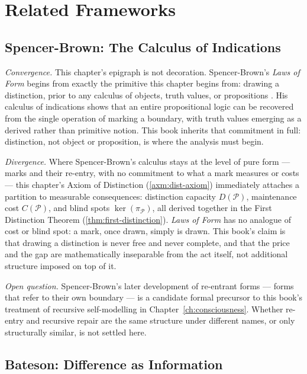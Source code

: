 \documentclass[12pt,twoside,openright]{book}
\newcommand{\partition}{\mathcal{P}}
\begin{document}
\section{Related Frameworks}
\label{sec:ch1-related-frameworks}

\subsection*{Spencer-Brown: The Calculus of Indications}

\emph{Convergence.} This chapter's epigraph is not decoration.
Spencer-Brown's \emph{Laws of Form} begins from exactly the
primitive this chapter begins from: drawing a distinction,
prior to any calculus of objects, truth values, or
propositions \parencite{spencer-brown1969}. His calculus of
indications shows that an entire propositional logic can be
recovered from the single operation of marking a boundary,
with truth values emerging as a derived rather than primitive
notion. This book inherits that commitment in full: distinction,
not object or proposition, is where the analysis must begin.

\emph{Divergence.} Where Spencer-Brown's calculus stays at the
level of pure form --- marks and their re-entry, with no
commitment to what a mark measures or costs --- this chapter's
Axiom of Distinction (\cref{axm:dist-axiom}) immediately
attaches a partition to measurable consequences: distinction
capacity $D(\partition)$, maintenance cost $C(\partition)$, and
blind spots $\ker(\pi_\partition)$, all derived together in the
First Distinction Theorem (\cref{thm:first-distinction}).
\emph{Laws of Form} has no analogue of cost or blind spot: a
mark, once drawn, simply is drawn. This book's claim is that
drawing a distinction is never free and never complete, and
that the price and the gap are mathematically inseparable from
the act itself, not additional structure imposed on top of it.

\emph{Open question.} Spencer-Brown's later development of
re-entrant forms --- forms that refer to their own boundary ---
is a candidate formal precursor to this book's treatment of
recursive self-modelling in Chapter~\ref{ch:consciousness}.
Whether re-entry and recursive repair are the same structure
under different names, or only structurally similar, is not
settled here.

\subsection*{Bateson: Difference as Information}
\end{document}
